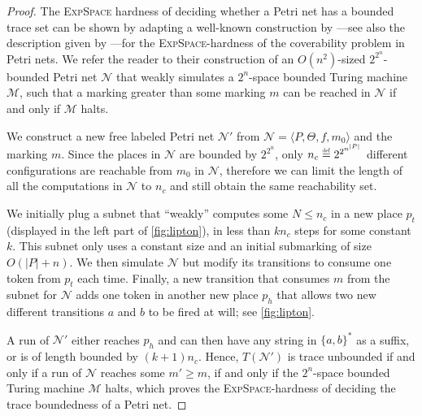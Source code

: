 \documentclass[11pt,reqno,a4paper]{amsart}
\newcommand{\eqdef}{\stackrel{\raisebox{-.15ex}{\scalebox{.5}{\upshape\textrm{def}}}}{=}}
\newcommand{\tup}[1]{\langle #1\rangle}
\theoremstyle{plain}
\theoremstyle{definition}
\theoremstyle{remark}
\begin{document}
\begin{figure*}[t!]
\caption{\label{fig:lipton}The Petri net $\mathcal{N}'$ of the proof
of \autoref{propexppn}.}
\end{figure*}
\begin{proof}The \textsc{ExpSpace} hardness of deciding whether a
  Petri net has a bounded trace set can be shown by adapting a well-known
  construction by \citet{lipton76}---see also the description given by
  \citet{esparza}---for the \textsc{ExpSpace}-hardness of the
  coverability problem in Petri nets.  We refer the reader to their
  construction of an $O(n^2)$-sized $2^{2^n}$-bounded Petri net
  $\mathcal{N}$ that weakly simulates a $2^n$-space bounded Turing
  machine $\mathcal{M}$, such that a marking greater than some marking
  $m$ can be reached in $\mathcal{N}$ if and only if $\mathcal{M}$
  halts. 

  We construct a new free labeled Petri net $\mathcal{N}'$ from
  $\mathcal{N}=\tup{P,\Theta,f,m_0}$ and the marking $m$.  Since the places
  in $\mathcal{N}$ are bounded by $2^{2^n}$, only $n_c\eqdef2^{2^{n^{|P|}}}$
  different configurations are reachable from $m_0$ in $\mathcal{N}$,
  therefore we can limit the length of all the computations in $\mathcal{N}$
  to $n_c$ and still obtain the same reachability set. 

  We initially plug a subnet that ``weakly'' computes some $N\leq n_c$
  in a new place $p_t$ (displayed in the left part of
  \autoref{fig:lipton}), in less than $kn_c$ steps for some constant
  $k$.  This subnet only uses a constant size and an initial
  submarking of size $O(|P|+n)$.  We then simulate $\mathcal{N}$ but
  modify its transitions to consume one token from $p_t$ each time.
  Finally, a new transition that consumes $m$ from the subnet for
  $\mathcal{N}$ adds one token in another new place $p_h$ that allows
  two new different transitions $a$ and $b$ to be fired at will; see
  \autoref{fig:lipton}.
  
  A run of $\mathcal{N}'$ either reaches $p_h$ and can then have any
  string in $\{a,b\}^\ast$ as a suffix, or is of length bounded by
  $(k+1)n_c$.  Hence, $T(\mathcal{N}')$ is trace unbounded if and only
  if a run of $\mathcal{N}$ reaches some $m'\geq m$, if and only if
  the $2^n$-space bounded Turing machine $\mathcal{M}$ halts, which
  proves the \textsc{ExpSpace}-hardness of deciding the trace
  boundedness of a Petri net.
\end{proof}
\end{document}
